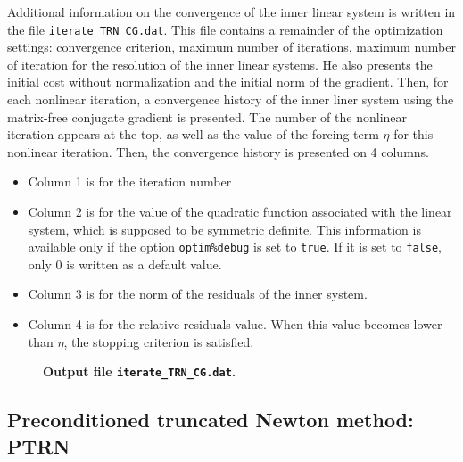 \documentclass[a4paper,twoside,final,onecolumn,11pt,openright]{article}
\begin{document}
Additional information on the convergence of the inner linear system is written in the file \texttt{iterate\_TRN\_CG.dat}. This file contains a remainder of the optimization settings: convergence criterion, maximum number of iterations, maximum number of iteration for the resolution of the inner linear systems.  He also presents the initial cost without normalization and the initial norm of the gradient. Then, for each nonlinear iteration, a convergence history of the inner liner system using the matrix-free conjugate gradient is presented. The number of the nonlinear iteration appears at the top, as well as the value of the forcing term $\eta$ for this nonlinear iteration. Then, the convergence history is presented on 4 columns. 
\begin{itemize}
\item Column 1 is for the iteration number
\item Column 2 is for the value of the quadratic function associated with the linear system, which is supposed to be symmetric definite. This information is available only if the option \texttt{optim\%debug} is set to \texttt{true}. If it is set to \texttt{false}, only $0$ is written as a default value. 
\item Column 3 is for the norm of the residuals of the inner system. 
\item Column 4 is for the relative residuals value. When this value becomes lower than $\eta$, the stopping criterion is satisfied. 
\end{itemize}

\begin{figure}
\tiny
 
\normalsize
\begin{center}
\textbf{Output file \texttt{iterate\_TRN\_CG.dat}.} 
\end{center}
 \end{figure}



\newpage
\subsection{Preconditioned truncated Newton method: PTRN}
\end{document}
